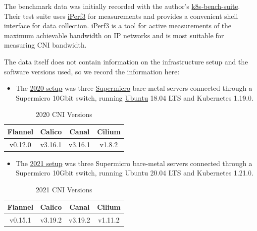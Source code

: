 The benchmark data was initially recorded with the author's \href{https://github.com/InfraBuilder/k8s-bench-suite}{k8s-bench-suite}. Their test suite uses \href{https://iperf.fr/}{iPerf3} for measurements and provides a convenient shell interface for data collection. iPerf3 is a tool for active measurements of the maximum achievable bandwidth on IP networks and is most suitable for measuring CNI bandwidth.

The data itself does not contain information on the infrastructure setup and the software versions used, so we record the information here:

\begin{itemize}
    \item The \href{https://github.com/InfraBuilder/benchmark-k8s-cni-2020-08/blob/master/PROTOCOL.md}{2020 setup} was three \href{https://www.supermicro.com/en/}{Supermicro} bare-metal servers connected through a Supermicro 10Gbit switch, running \href{https://ubuntu.com/server}{Ubuntu} 18.04 LTS and Kubernetes 1.19.0.
\end{itemize}

\begin{table}[H]
\caption{2020 CNI Versions}
\begin{tabular}{|c | c | c | c |} 
 \hline
 Flannel & Calico & Canal & Cilium \\
 \hline
 v0.12.0 & v3.16.1 & v3.16.1 & v1.8.2 \\ 
 \hline
\end{tabular}
\label{tab:2020ver}
\end{table}

\begin{itemize}
    \item The \href{https://github.com/InfraBuilder/benchmark-k8s-cni-2021-05/blob/main/PROTOCOL.md}{2021 setup} was three Supermicro bare-metal servers connected through a Supermicro 10Gbit switch, running Ubuntu 20.04 LTS and Kubernetes 1.21.0.
\end{itemize}

\begin{table}[H]
\caption{2021 CNI Versions}
\begin{tabular}{|c | c | c | c |} 
 \hline
 Flannel & Calico & Canal & Cilium \\
 \hline
 v0.15.1 & v3.19.2 & v3.19.2 & v1.11.2 \\ 
 \hline
\end{tabular}
\label{tab:2021ver}
\end{table}

